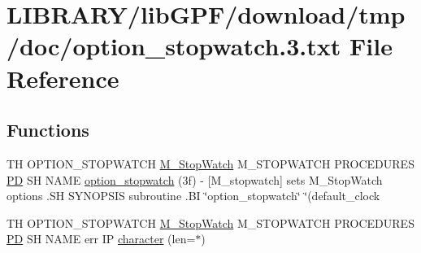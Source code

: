\hypertarget{option__stopwatch_83_8txt}{}\section{L\+I\+B\+R\+A\+R\+Y/lib\+G\+P\+F/download/tmp/doc/option\+\_\+stopwatch.3.txt File Reference}
\label{option__stopwatch_83_8txt}
\subsection*{Functions}
\begin{DoxyCompactItemize}
\item 
TH O\+P\+T\+I\+O\+N\+\_\+\+S\+T\+O\+P\+W\+A\+T\+CH \hyperlink{option__stopwatch_83_8txt_aa2011fc45a5e502e87ee50996a8a9305}{M\+\_\+\+Stop\+Watch} M\+\_\+\+S\+T\+O\+P\+W\+A\+T\+CH P\+R\+O\+C\+E\+D\+U\+R\+ES \hyperlink{what__overview_81_8txt_a85f26da5a4481fbdb0d9c79f2b94de3e}{PD} SH N\+A\+ME \hyperlink{option__stopwatch_83_8txt_a072343f3f6ffc9c62d2c380e17f7de21}{option\+\_\+stopwatch} (3f) -\/ \mbox{[}\+M\+\_\+stopwatch\mbox{]} sets M\+\_\+\+Stop\+Watch options .\+S\+H S\+Y\+N\+O\+P\+S\+I\+S subroutine .\+B\+I \char`\"{}option\+\_\+stopwatch\char`\"{} \char`\"{}(default\+\_\+clock
\item 
TH O\+P\+T\+I\+O\+N\+\_\+\+S\+T\+O\+P\+W\+A\+T\+CH \hyperlink{option__stopwatch_83_8txt_aa2011fc45a5e502e87ee50996a8a9305}{M\+\_\+\+Stop\+Watch} M\+\_\+\+S\+T\+O\+P\+W\+A\+T\+CH P\+R\+O\+C\+E\+D\+U\+R\+ES \hyperlink{what__overview_81_8txt_a85f26da5a4481fbdb0d9c79f2b94de3e}{PD} SH N\+A\+ME err IP \hyperlink{option__stopwatch_83_8txt_abd4b21fbbd175834027b5224bfe97e66}{character} (len=$\ast$)
\item 

\end{DoxyCompactItemize}
